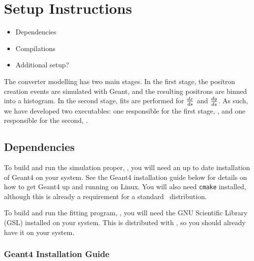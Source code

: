 \documentclass[12pt]{article}
\begin{document}
\section{Setup Instructions}
\begin{itemize}
\item
Dependencies

\item
Compilations

\item
Additional setup?

\end{itemize}
The converter modelling has two main stages.
In the first stage, the positron creation events are simulated with Geant, and the resulting positrons are binned into a histogram.
In the second stage, fits are performed for $\frac{dx}{ds}$ and $\frac{dy}{ds}$.
As such, we have developed two executables: one responsible for the first stage, \exes, and one responsible for the second, \exef.

\subsection{Dependencies}
To build and run the simulation proper, \exes, you will need an up to date installation of Geant4 on your system.
See the Geant4 installation guide below for details on how to get Geant4 up and running on Linux.
You will also need \texttt{cmake} installed, although this is already a requirement for a standard \bmad \, distribution.

To build and run the fitting program, \exef, you will need the GNU Scientific Library (GSL) installed on your system.
This is distributed with \bmad, so you should already have it on your system.

\subsubsection{Geant4 Installation Guide}
\end{document}
